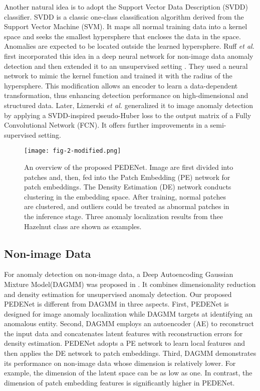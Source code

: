 \documentclass{article}
\begin{document}
Another natural idea is to adopt the Support Vector Data Description
(SVDD) classifier. SVDD is a classic one-class classification algorithm
derived from the Support Vector Machine (SVM). It maps all normal
training data into a kernel space and seeks the smallest hypersphere
that encloses the data in the space. Anomalies are expected to be
located outside the learned hypersphere. Ruff {\em et al.}
\cite{ruff2018deep} first incorporated this idea in a deep neural
network for non-image data anomaly detection and then extended it to an
unsupervised setting \cite{ruff2019deep}. They used a neural network
to mimic the kernel function and trained it with the radius of the
hypersphere. This modification allows an encoder to learn a
data-dependent transformation, thus enhancing detection performance on
high-dimensional and structured data.  Later, Liznerski {\em et al.}
\cite{liznerski2020explainable} generalized it to image anomaly
detection by applying a SVDD-inspired pseudo-Huber loss to the output
matrix of a Fully Convolutional Network (FCN). It offers further
improvements in a semi-supervised setting. 

\begin{figure*}[t]
\centering
\texttt{[image: fig-2-modified.png]}
\caption{An overview of the proposed PEDENet. Image are first divided
into patches and, then, fed into the Patch Embedding (PE) network for
patch embeddings. The Density Estimation (DE) network conducts clustering 
in the embedding space. After training, normal patches are clustered, and
outliers could be treated as abnormal patches in the inference stage. Three
anomaly localization results from thee Hazelnut class are shown as examples.}\label{fig:2a}
\end{figure*}


\subsection{Non-image Data}\label{subsec:non-image}

For anomaly detection on non-image data, a Deep Autoencoding Gaussian
Mixture Model(DAGMM) was proposed in \cite{zong2018deep}. It combines
dimensionality reduction and density estimation for unsupervised anomaly
detection. Our proposed PEDENet is different from DAGMM in three
aspects. First, PEDENet is designed for image anomaly localization while
DAGMM targets at identifying an anomalous entity. Second, DAGMM employs
an autoencoder (AE) to reconstruct the input data and concatenates
latent features with reconstruction errors for density estimation.
PEDENet adopts a PE network to learn local features and then applies the
DE network to patch embeddings. Third, DAGMM demonstrates its performance
on non-image data whose dimension is relatively lower. For example, the
dimension of the latent space can be as low as one. In contrast, the
dimension of patch embedding features is significantly higher in
PEDENet. 
\end{document}
